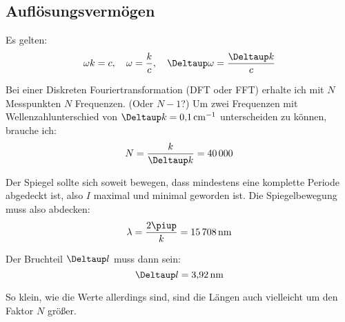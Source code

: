 \subsection{Auflösungsvermögen}

Es gelten:
\[
	\omega k = c
	\eqnsep
	\omega = \frac kc
	\eqnsep
	\Deltaup \omega = \frac{\Deltaup k}c
\]

Bei einer Diskreten Fouriertransformation (DFT oder FFT) erhalte ich mit $N$
Messpunkten $N$ Frequenzen. (Oder $N-1$?) Um zwei Frequenzen mit
Wellenzahlunterschied von $\Deltaup k = \SI{.1}{\per\centi\meter}$
unterscheiden zu können, brauche ich:
\[
	N = \frac{k}{\Deltaup k} = \num{40000}
\]

Der Spiegel sollte sich soweit bewegen, dass mindestens eine komplette Periode
abgedeckt ist, also $I$ maximal und minimal geworden ist. Die Spiegelbewegung
muss also abdecken:
\[
	\lambda = \frac{2\piup}{k} = \SI{15708}{\nano\meter}
\]

Der Bruchteil $\Deltaup l$ muss dann sein:
\[
	\Deltaup l = \SI{3.92}{\nano\meter}
\]

So klein, wie die Werte allerdings sind, sind die Längen auch vielleicht um den
Faktor $N$ größer.


\IfFileExists{\bibliographyfile}{
	
}{}



